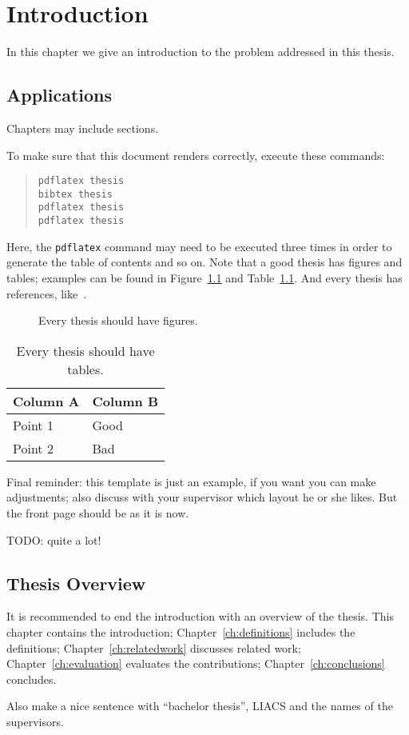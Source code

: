 \chapter{Introduction}  \label{ch:introduction}
In this chapter we give an introduction to the problem addressed in this thesis.


\section{Applications}
Chapters may include sections.

To make sure that this document renders correctly, execute these commands:
\begin{quote}
\begin{verbatim}
pdflatex thesis
bibtex thesis
pdflatex thesis
pdflatex thesis
\end{verbatim}
\end{quote}
Here, the \verb|pdflatex| command may need to be executed three times in order to generate the table of contents and so on. 
Note that a good thesis has figures and tables; examples can be found in Figure~\ref{fig:afigure} and Table~\ref{tab:atable}. And every thesis has references, like~\cite{brilliantgift15}.

\begin{figure}
\begin{center}
\end{center}
\caption{Every thesis should have figures.\label{fig:afigure}}
\end{figure}

\begin{table}
\begin{center}
\begin{tabular}{ll}
Column A & Column B\\
\hline
Point 1 & Good\\
Point 2 & Bad\\
\end{tabular}
\end{center}
\caption{Every thesis should have tables.\label{tab:atable}}
\end{table}

Final reminder: this template is just an example, if you want you can make adjustments; also discuss with your supervisor which layout he or she likes. But the front page should be as it is now.

TODO: quite a lot!

\section{Thesis Overview}
It is recommended to end the introduction with an overview of the thesis. This chapter contains the introduction; Chapter~\ref{ch:definitions} includes the definitions; Chapter~\ref{ch:relatedwork} discusses related work; Chapter~\ref{ch:evaluation} evaluates the contributions; Chapter~\ref{ch:conclusions} concludes.

Also make a nice sentence with ``bachelor thesis'', LIACS and the names of the supervisors.

